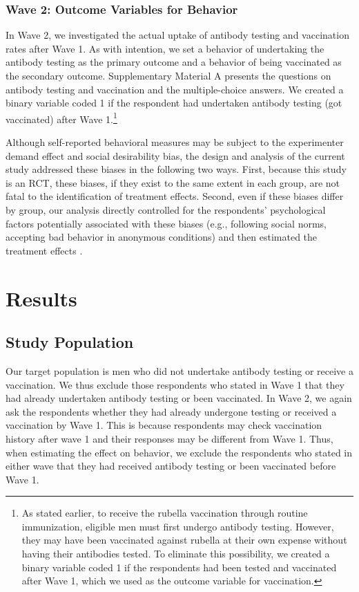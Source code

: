 \documentclass[
      12pt,
    a4paper
]{article}
\begin{document}
\hypertarget{wave2}{%
\subsubsection{Wave 2: Outcome Variables for Behavior}\label{wave2}}

In Wave 2, we investigated the actual uptake of antibody testing and vaccination rates after Wave 1. As with intention, we set a behavior of undertaking the antibody testing as the primary outcome and a behavior of being vaccinated as the secondary outcome. Supplementary Material A presents the questions on antibody testing and vaccination and the multiple-choice answers. We created a binary variable coded 1 if the respondent had undertaken antibody testing (got vaccinated) after Wave 1.\footnote{As stated earlier, to receive the rubella vaccination through routine immunization, eligible men must first undergo antibody testing. However, they may have been vaccinated against rubella at their own expense without having their antibodies tested. To eliminate this possibility, we created a binary variable coded 1 if the respondents had been tested and vaccinated after Wave 1, which we used as the outcome variable for vaccination.}

Although self-reported behavioral measures may be subject to the experimenter demand effect and social desirability bias, the design and analysis of the current study addressed these biases in the following two ways. First, because this study is an RCT, these biases, if they exist to the same extent in each group, are not fatal to the identification of treatment effects. Second, even if these biases differ by group, our analysis directly controlled for the respondents' psychological factors potentially associated with these biases (e.g., following social norms, accepting bad behavior in anonymous conditions) and then estimated the treatment effects .

\hypertarget{results}{%
\section{Results}\label{results}}

\hypertarget{sample}{%
\subsection{Study Population}\label{sample}}

Our target population is men who did not undertake antibody testing or receive a vaccination. We thus exclude those respondents who stated in Wave 1 that they had already undertaken antibody testing or been vaccinated. In Wave 2, we again ask the respondents whether they had already undergone testing or received a vaccination by Wave 1. This is because respondents may check vaccination history after wave 1 and their responses may be different from Wave 1. Thus, when estimating the effect on behavior, we exclude the respondents who stated in either wave that they had received antibody testing or been vaccinated before Wave 1.
\end{document}

